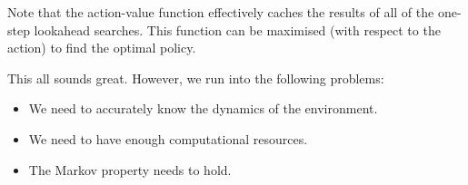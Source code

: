 \documentclass{article}
\newcommand{\ix}[1]{%
  \leavevmode %
  \marginpar{\small\emph{#1}}%
}
\begin{document}
Note that the action-value function effectively caches the results of all of the one-step lookahead searches. This function can be maximised (with respect to the action) to find the optimal policy. 

This all sounds great. However, we run into the following problems:\ix{Caveats}
\begin{itemize}[noitemsep]
	\item We need to accurately know the dynamics of the environment.
	\item We need to have enough computational resources.
	\item The Markov property needs to hold. 
\end{itemize}
\end{document}
